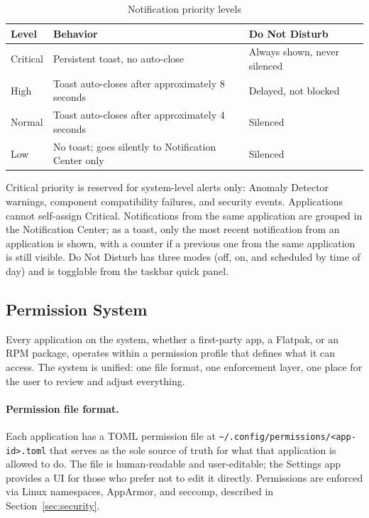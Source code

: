 \begin{table}[htbp]
\caption{Notification priority levels}
\label{tab:notifications}
\begin{tabularx}{\linewidth}{lXX}
\toprule
\textbf{Level} & \textbf{Behavior} & \textbf{Do Not Disturb} \\
\midrule
Critical & Persistent toast, no auto-close &
  Always shown, never silenced \\
High     & Toast auto-closes after approximately 8 seconds &
  Delayed, not blocked \\
Normal   & Toast auto-closes after approximately 4 seconds &
  Silenced \\
Low      & No toast; goes silently to Notification Center only &
  Silenced \\
\bottomrule
\end{tabularx}
\end{table}

Critical priority is reserved for system-level alerts only: Anomaly Detector
warnings, component compatibility failures, and security events. Applications
cannot self-assign Critical. Notifications from the same application are
grouped in the Notification Center; as a toast, only the most recent
notification from an application is shown, with a counter if a previous one
from the same application is still visible. Do Not Disturb has three modes
(off, on, and scheduled by time of day) and is togglable from the taskbar quick
panel.

\subsection{Permission System}
\label{sec:permissions}

Every application on the system, whether a first-party app, a Flatpak, or an
RPM package, operates within a permission profile that defines what it can
access. The system is unified: one file format, one enforcement layer, one
place for the user to review and adjust everything.

\paragraph{Permission file format.}
Each application has a TOML permission file at
\texttt{\textasciitilde/.config/permissions/<app-id>.toml} that serves as the
sole source of truth for what that application is allowed to do. The file is
human-readable and user-editable; the Settings app provides a UI for those who
prefer not to edit it directly. Permissions are enforced via Linux namespaces,
AppArmor, and seccomp, described in Section~\ref{sec:security}.


